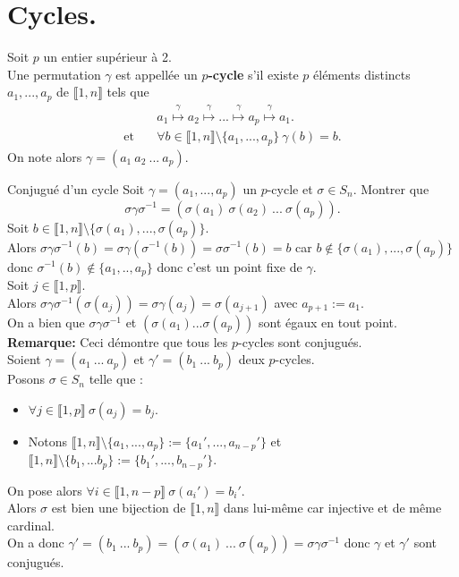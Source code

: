 \documentclass[11pt]{article}
\newcommand*{\lb}{\llbracket}
\newcommand*{\rb}{\rrbracket}
\newcommand{\0}{\varnothing}
\newcommand*{\g}{\gamma}
\newcommand*{\s}{\sigma}
\begin{document}
\section{Cycles.}

\begin{defi}{}{}
    Soit $p$ un entier supérieur à 2.\\
    Une permutation $\g$ est appellée un $p$\textbf{-cycle} s'il existe $p$ éléments distincts $a_1,...,a_p$ de $\lb1,n\rb$ tels que
    \begin{align*}
        &a_1\overset{\g}{\mapsto}a_2\overset{\g}{\mapsto}...\overset{\g}{\mapsto}a_p\overset{\g}{\mapsto}a_1.\\
        \text{et} \quad &\forall b \in \lb1,n\rb\setminus\{a_1,...,a_p\} ~ \g(b)=b.
    \end{align*}
    On note alors $\g=(a_1~a_2~...~a_p)$.
\end{defi}


\begin{ex}{Conjugué d'un cycle}{}
    Soit $\g=(a_1,...,a_p)$ un $p$-cycle et $\s\in S_n$. Montrer que
    \begin{equation*}
        \s\g\s^{-1}=(\s(a_1)~\s(a_2)~...~\s(a_p)).
    \end{equation*}
    \tcblower
    Soit $b\in\lb1,n\rb\setminus\{\s(a_1),...,\s(a_p)\}$.\\
    Alors $\s\g\s^{-1}(b)=\s\g(\s^{-1}(b))=\s\s^{-1}(b)=b$ car $b\notin\{\s(a_1),...,\s(a_p)\}$ donc $\s^{-1}(b)\notin\{a_1,..,a_p\}$ donc c'est un point fixe de $\g$.\\[0.2cm]
    Soit $j\in\lb1,p\rb$.\\
    Alors $\s\g\s^{-1}(\s(a_j))=\s\g(a_j)=\s(a_{j+1})$ avec $a_{p+1}:=a_1$.\\
    On a bien que $\s\g\s^{-1}$ et $(\s(a_1)...\s(a_p))$ sont égaux en tout point.\\[0.2cm]
    \textbf{Remarque:} Ceci démontre que tous les $p$-cycles sont conjugués.\\
    Soient $\g=(a_1~...~a_p)$ et $\g'=(b_1~...~b_p)$ deux $p$-cycles.\\
    Posons $\s\in S_n$ telle que :
    \begin{itemize}
        \item $\forall j \in \lb 1, p \rb ~ \s(a_j) = b_j$.
        \item Notons $\lb 1, n \rb \setminus \{a_1, ..., a_p\} := \{a_1', ..., a_{n-p}'\}$ et $\lb 1, n \rb \setminus \{b_1, ... b_p\} := \{b_1', ... , b_{n-p}'\}$.
    \end{itemize}
    On pose alors $\forall i\in\lb1,n-p\rb ~ \s(a_i')=b_i'$.\\
    Alors $\s$ est bien une bijection de $\lb1,n\rb$ dans lui-même car injective et de même cardinal.\\
    On a donc $\g'=(b_1~...~b_p) = (\s(a_1)~...~\s(a_p))=\s\g\s^{-1}$ donc $\g$ et $\g'$ sont conjugués.
\end{ex}
\end{document}
